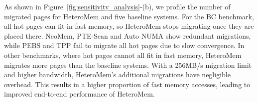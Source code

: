 As shown in Figure~\ref{fig:sensitivity_analysis}-(b), we profile the number of migrated pages for HeteroMem and five baseline systems. For the BC benchmark, all hot pages can fit in fast memory, so HeteroMem stops migrating once they are placed there. NeoMem, PTE-Scan and Auto NUMA show redundant migrations, while PEBS and TPP fail to migrate all hot pages due to slow convergence.
In other benchmarks, where hot pages cannot all fit in fast memory, HeteroMem migrates more pages than the baseline systems. With a 256MB/s migration limit and higher bandwidth, HeteroMem's additional migrations have negligible overhead. This results in a higher proportion of fast memory accesses, leading to improved end-to-end performance of HeteroMem.




